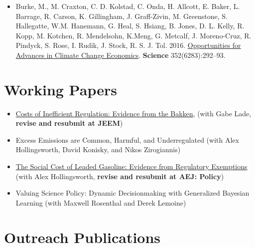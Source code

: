 \documentclass{res} %
\begin{document}
\begin{resume}
\begin{itemize}
	\item[]  Burke, M., M. Craxton, C. D. Kolstad, C. Onda, H. Allcott, E. Baker, L. Barrage, R. Carson, K. Gillingham, J. Graff-Zivin, M. Greenstone, S. Hallegatte, W.M. Hanemann, G. Heal, S. Hsiang, B. Jones, D. L. Kelly, R. Kopp, M. Kotchen, R. Mendelsohn, K.Meng, G. Metcalf, J. Moreno-Cruz, R. Pindyck, S. Rose, I. Rudik, J. Stock, R. S. J. Tol. 2016. \href{http://science.sciencemag.org/content/352/6283/292.abstract}{Opportunities for Advances in Climate Change Economics}. \textbf{Science} 352(6283):292--93.
\end{itemize}
\vspace{-.075in}

\section{Working Papers}

\begin{itemize} %
	\item[] \href{https://papers.ssrn.com/sol3/papers.cfm?abstract_id=3086728}{Costs of Inefficient Regulation: Evidence from the Bakken}, (with Gabe Lade, \textbf{revise and resubmit at JEEM})
	\item[] Excess Emissions are Common, Harmful, and Underregulated (with Alex Hollingsworth, David Konisky, and Nikos Zirogiannis)
	
	\item[] \href{https://osf.io/preprints/socarxiv/rdy6g}{The Social Cost of Leaded Gasoline: Evidence from Regulatory Exemptions} (with Alex Hollingsworth, \textbf{revise and resubmit at AEJ: Policy})
	\item[] Valuing Science Policy: Dynamic Decisionmaking with Generalized Bayesian Learning (with Maxwell Rosenthal and Derek Lemoine)

\end{itemize}
\vspace{-.075in}
\section{Outreach Publications}


\end{resume}
\end{document}
